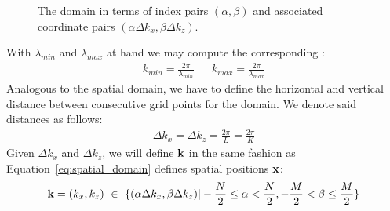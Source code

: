 \begin{figure}
\centering
\caption[The \wavevector domain.]{
The \wavevector domain in terms of index pairs $(\alpha,\beta)$ and
associated coordinate pairs $(\alpha\Delta k_x,\beta\Delta k_z)$.}
\label{fig:wave_vector_domain}
\end{figure}
%
With $\lambda_{min}$ and $\lambda_{max}$ at hand we may compute the
corresponding \wavenumbers:
\begin{align}
\label{eq:kmin_kmax}
 k_{min} = \frac{2\pi}{\lambda_{min}} && k_{max} = \frac{2\pi}{\lambda_{max}}
\end{align}
%
Analogous to the spatial domain, we have to define the horizontal and vertical 
distance between consecutive grid points for the \wavevector domain. We denote 
said distances as follows:
\begin{align}
\label{eq:delta_kx_delta_ky}
 \Delta k_x = \Delta k_z = \frac{2\pi}{L} = \frac{2\pi}{K}
\end{align}
%
Given $\Delta k_x$ and $\Delta k_z$, we will define \wavevectors $\mathbf{k}$ in 
the same fashion as Equation~\ref{eq:spatial_domain} defines spatial positions 
$\mathbf{x}$:
\begin{equation}
\label{eq:wave_vector_domain}
 \mathbf{k} = (k_x,k_z)~\in~\{(\alpha\Delta k_x,\beta\Delta k_z)|
-\frac{N}{2}\leq\alpha<\frac{N}{2},-\frac{M}{2}<\beta\leq\frac{M}{2}\}
\end{equation}
